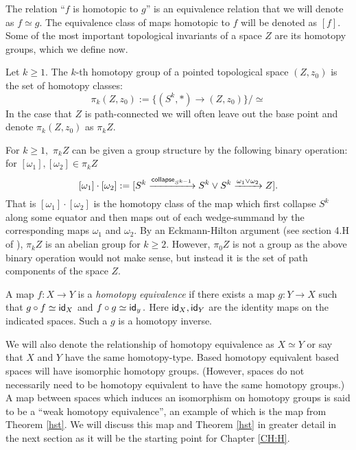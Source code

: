 The relation ``$f$ is homotopic to $g$'' is an equivalence relation that we will denote as $f \simeq g.$ The equivalence class of maps homotopic to $f$ will be denoted as $[f].$ Some of the most important topological invariants of a space $Z$ are its homotopy groups, which we define now.

\begin{definition}
Let $k \geq 1.$ The $k$-th homotopy group of a pointed topological space $(Z, z_{0})$ is the set of homotopy classes: 
\[
\pi_{k}(Z, z_{0}) := \Big\{(S^{k}, \ast) \rightarrow (Z, z_{0})\Big\}/\simeq
\]
In the case that $Z$ is path-connected we will often leave out the base point and denote $\pi_{k}(Z, z_{0})$ as $\pi_{k}Z.$
\end{definition}

\begin{remark} \label{homprod}
For $k \geq 1,$ $\pi_{k}Z$ can be given a group structure by the following binary operation: for $[\omega_{1}], [\omega_{2}] \in \pi_{k}Z$
\[
[\omega_{1}] \cdot [\omega_{2}] := [S^{k} \xrightarrow{{\sf collapse}_{S^{k - 1}}} S^{k} \vee S^{k} \xrightarrow{\omega_{1} \vee \omega_{2}} Z].
\]
That is $[\omega_{1}] \cdot [\omega_{2}]$ is the homotopy class of the map which first collapse $S^{k}$ along some equator and then maps out of each wedge-summand by the corresponding maps $\omega_{1}$ and $\omega_{2}$. By an Eckmann-Hilton argument (see section 4.H of \cite{Hatch}), $\pi_{k}Z$ is an abelian group for $k \geq 2.$ However, $\pi_{0}Z$ is not a group as the above binary operation would not make sense, but instead it is the set of path components of the space $Z.$ 
\end{remark}

\begin{definition}
A map $f \colon X \rightarrow Y$ is a \textit{homotopy equivalence} if there exists a map $g: Y \rightarrow X$ such that $g \circ f \simeq \operatorname{\sf id}_{X}$ and $f \circ g \simeq \operatorname{\sf id}_{y}.$ Here $\operatorname{\sf id}_{X}, \operatorname{\sf id}_{Y}$ are the identity maps on the indicated spaces. Such a $g$ is a homotopy inverse.
\end{definition}

We will also denote the relationship of homotopy equivalence as $X \simeq Y$ or say that $X$ and $Y$ have the same homotopy-type. Based homotopy equivalent based spaces will have isomorphic homotopy groups. (However, spaces do not necessarily need to be homotopy equivalent to have the same homotopy groups.) A map between spaces which induces an isomorphism on homotopy groups is said to be a ``weak homotopy equivalence'', an example of which is the map from Theorem \ref{hst}. We will discuss this map and Theorem \ref{hst} in greater detail in the next section as it will be the starting point for Chapter \ref{CH:H}.







